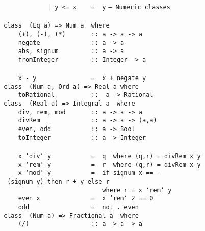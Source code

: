 \mbox{\tt \ \ \ \ \ \ \ \ \ \ \ \ |\ y\ <=\ x\ \ \ \ =\ \ y}
\eprogB\noindent\bprogB
\mbox{\tt --\ Numeric\ classes}\\
\mbox{\tt }\\
\mbox{\tt class\ \ (Eq\ a)\ =>\ Num\ a\ \ where}\\
\mbox{\tt \ \ \ \ (+),\ (-),\ (*)\ \ \ \ \ \ \ ::\ a\ ->\ a\ ->\ a}\\
\mbox{\tt \ \ \ \ negate\ \ \ \ \ \ \ \ \ \ \ \ \ \ ::\ a\ ->\ a}\\
\mbox{\tt \ \ \ \ abs,\ signum\ \ \ \ \ \ \ \ \ ::\ a\ ->\ a}\\
\mbox{\tt \ \ \ \ fromInteger\ \ \ \ \ \ \ \ \ ::\ Integer\ ->\ a}\\
\mbox{\tt }\\
\mbox{\tt \ \ \ \ x\ -\ y\ \ \ \ \ \ \ \ \ \ \ \ \ \ \ =\ \ x\ +\ negate\ y}
\eprogB\noindent\bprogB
\mbox{\tt class\ \ (Num\ a,\ Ord\ a)\ =>\ Real\ a\ where}\\
\mbox{\tt \ \ \ \ toRational\ \ \ \ \ \ \ \ \ \ ::\ \ a\ ->\ Rational}
\eprogB\noindent\bprogB
\mbox{\tt class\ \ (Real\ a)\ =>\ Integral\ a\ \ where}\\
\mbox{\tt \ \ \ \ div,\ rem,\ mod\ \ \ \ \ \ \ ::\ a\ ->\ a\ ->\ a}\\
\mbox{\tt \ \ \ \ divRem\ \ \ \ \ \ \ \ \ \ \ \ \ \ ::\ a\ ->\ a\ ->\ (a,a)}\\
\mbox{\tt \ \ \ \ even,\ odd\ \ \ \ \ \ \ \ \ \ \ ::\ a\ ->\ Bool}\\
\mbox{\tt \ \ \ \ toInteger\ \ \ \ \ \ \ \ \ \ \ ::\ a\ ->\ Integer}\\
\mbox{\tt }\\
\mbox{\tt \ \ \ \ x\ `div`\ y\ \ \ \ \ \ \ \ \ \ \ =\ \ q\ \ where\ (q,r)\ =\ divRem\ x\ y}\\
\mbox{\tt \ \ \ \ x\ `rem`\ y\ \ \ \ \ \ \ \ \ \ \ =\ \ r\ \ where\ (q,r)\ =\ divRem\ x\ y}\\
\mbox{\tt \ \ \ \ x\ `mod`\ y\ \ \ \ \ \ \ \ \ \ \ =\ \ if\ signum\ x\ ==\ -\ (signum\ y)\ then\ r\ +\ y\ else\ r}\\
\mbox{\tt \ \ \ \ \ \ \ \ \ \ \ \ \ \ \ \ \ \ \ \ \ \ \ \ \ \ \ where\ r\ =\ x\ `rem`\ y}\\
\mbox{\tt \ \ \ \ even\ x\ \ \ \ \ \ \ \ \ \ \ \ \ \ =\ \ x\ `rem`\ 2\ ==\ 0}\\
\mbox{\tt \ \ \ \ odd\ \ \ \ \ \ \ \ \ \ \ \ \ \ \ \ \ =\ \ not\ .\ even}
\eprogB\noindent\bprogB
\mbox{\tt class\ \ (Num\ a)\ =>\ Fractional\ a\ \ where}\\
\mbox{\tt \ \ \ \ (/)\ \ \ \ \ \ \ \ \ \ \ \ \ \ \ \ \ ::\ a\ ->\ a\ ->\ a}\\
